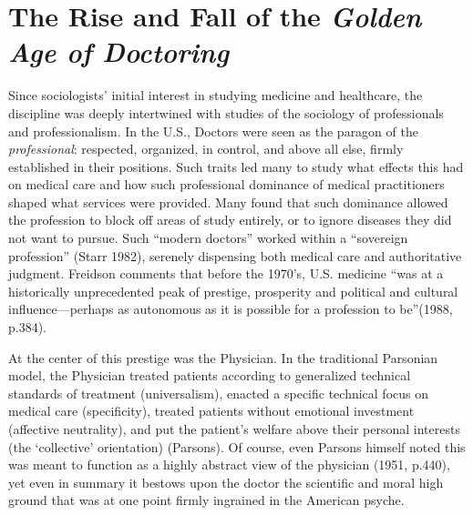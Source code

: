 \documentclass[12pt,twoside]{reedthesis}
\begin{document}
  \section*{\texorpdfstring{The Rise and Fall of the \emph{Golden Age of
  Doctoring}}{The Rise and Fall of the Golden Age of Doctoring}}\label{the-rise-and-fall-of-the-golden-age-of-doctoring}
  
  Since sociologists' initial interest in studying medicine and
  healthcare, the discipline was deeply intertwined with studies of the
  sociology of professionals and professionalism. In the U.S., Doctors
  were seen as the paragon of the \emph{professional}: respected,
  organized, in control, and above all else, firmly established in their
  positions. Such traits led many to study what effects this had on
  medical care and how such professional dominance of medical
  practitioners shaped what services were provided. Many found that such
  dominance allowed the profession to block off areas of study entirely,
  or to ignore diseases they did not want to pursue. Such ``modern
  doctors'' worked within a ``sovereign profession'' (Starr 1982),
  serenely dispensing both medical care and authoritative judgment.
  Freidson comments that before the 1970's, U.S. medicine ``was at a
  historically unprecedented peak of prestige, prosperity and political
  and cultural influence---perhaps as autonomous as it is possible for a
  profession to be''(1988, p.384).
  
  At the center of this prestige was the Physician. In the traditional
  Parsonian model, the Physician treated patients according to generalized
  technical standards of treatment (universalism), enacted a specific
  technical focus on medical care (specificity), treated patients without
  emotional investment (affective neutrality), and put the patient's
  welfare above their personal interests (the `collective' orientation)
  (Parsons). Of course, even Parsons himself noted this was meant to
  function as a highly abstract view of the physician (1951, p.440), yet
  even in summary it bestows upon the doctor the scientific and moral high
  ground that was at one point firmly ingrained in the American psyche.
  
\end{document}

